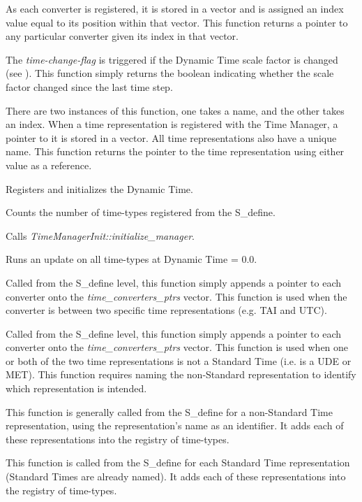 {\begin{enumerate}
{\begin{enumerate}
As each converter is registered, it is stored in a vector and is assigned an
index value equal to its position within that vector.
This function returns a pointer to any particular
converter given its index in that vector.

The \textit{time-change-flag} is triggered if the Dynamic Time scale
factor is changed (see ).
This function simply returns
the boolean indicating whether the scale factor changed since the last
time step.

There are two instances of this function, one takes a name, and the
other takes an index.  When a time representation is registered with
the Time Manager, a pointer to it is stored in a vector.  All time
representations also have a unique name.  This function returns the
pointer to the time representation using either value as a reference.

Registers and initializes the Dynamic Time.

Counts the number of time-types registered from the S\_define.

Calls \textit{TimeManagerInit::initialize\_manager}.

Runs an update on all time-types at Dynamic Time = 0.0.

Called from the S\_define level, this function simply appends a pointer to
each converter onto the \textit{time\_converters\_ptrs}
vector.  This function is used when the converter is between two
specific time representations (e.g. TAI and UTC).

Called from the S\_define level, this function simply appends a pointer to
each converter onto the \textit{time\_converters\_ptrs}
vector.  This function is used when one or both of the two time
representations is not a Standard Time (i.e. is a UDE or MET).  This
function requires naming the non-Standard representation to identify
which representation is intended.

This function is generally called from the S\_define for a non-Standard Time
representation, using the representation's name as an
identifier.  It adds each of these representations into the registry of
time-types.

This function is called from the S\_define for each Standard Time
representation (Standard Times are already named).  It adds each of these
representations into the registry of time-types.


\end{enumerate}}
\end{enumerate}}
